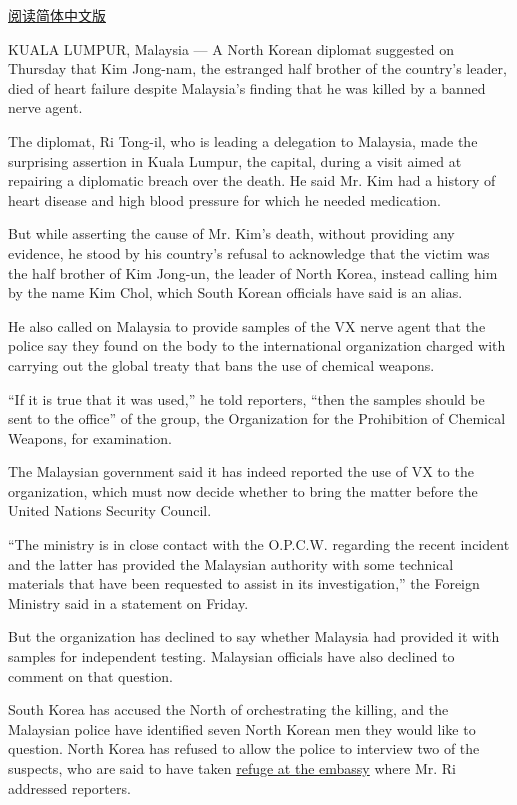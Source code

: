 \href{http://cn.nytimes.com/asia-pacific/20170303/kim-jong-nam-assassination-north-korea-visa-malaysia/}{阅读简体中文版}

KUALA LUMPUR, Malaysia --- A North Korean diplomat suggested on Thursday
that Kim Jong-nam, the estranged half brother of the country's leader,
died of heart failure despite Malaysia's finding that he was killed by a
banned nerve agent.

The diplomat, Ri Tong-il, who is leading a delegation to Malaysia, made
the surprising assertion in Kuala Lumpur, the capital, during a visit
aimed at repairing a diplomatic breach over the death. He said Mr. Kim
had a history of heart disease and high blood pressure for which he
needed medication.

But while asserting the cause of Mr. Kim's death, without providing any
evidence, he stood by his country's refusal to acknowledge that the
victim was the half brother of Kim Jong-un, the leader of North Korea,
instead calling him by the name Kim Chol, which South Korean officials
have said is an alias.

He also called on Malaysia to provide samples of the VX nerve agent that
the police say they found on the body to the international organization
charged with carrying out the global treaty that bans the use of
chemical weapons.

``If it is true that it was used,'' he told reporters, ``then the
samples should be sent to the office'' of the group, the Organization
for the Prohibition of Chemical Weapons, for examination.

The Malaysian government said it has indeed reported the use of VX to
the organization, which must now decide whether to bring the matter
before the United Nations Security Council.

``The ministry is in close contact with the O.P.C.W. regarding the
recent incident and the latter has provided the Malaysian authority with
some technical materials that have been requested to assist in its
investigation,'' the Foreign Ministry said in a statement on Friday.

But the organization has declined to say whether Malaysia had provided
it with samples for independent testing. Malaysian officials have also
declined to comment on that question.

South Korea has accused the North of orchestrating the killing, and the
Malaysian police have identified seven North Korean men they would like
to question. North Korea has refused to allow the police to interview
two of the suspects, who are said to have taken
\href{https://www.nytimes.com/2017/03/01/world/asia/malaysia-kim-jong-nam-embassy-immunity.html}{refuge
at the embassy} where Mr. Ri addressed reporters.

